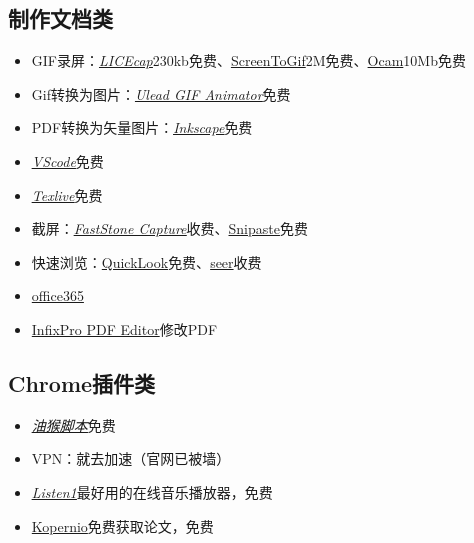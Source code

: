 \documentclass[UTF8]{ctexbook}
\begin{document}
\subsection{制作文档类}
\begin{itemize}
	\item GIF录屏：\underline{\textit{\href{https://www.cockos.com/licecap/}{LICEcap}}}\quad 230kb免费、\href{https://www.screentogif.com/?l=zh_cn}{ScreenToGif}\quad 2M免费、\href{https://ocam.en.softonic.com}{Ocam}\quad 10Mb免费
	\item Gif转换为图片：\underline{\textit{\href{https://ulead-gif-animator.jaleco.com}{Ulead GIF Animator}}}\quad 免费
	\item PDF转换为矢量图片：\underline{\textit{\href{https://inkscape.org}{Inkscape}}}\quad 免费
	\item \underline{\textit{\href{https://code.visualstudio.com}{VScode}}}\quad 免费
	\item \underline{\textit{\href{https://mirrors.tuna.tsinghua.edu.cn/CTAN/systems/texlive/Images/}{Texlive}}}\quad 免费
	\item 截屏：\underline{\textit{\href{http://www.faststone.org/FSCaptureDetail.htm}{FastStone Capture}}}\quad 收费、\href{https://www.snipaste.com}{Snipaste}\quad 免费
	\item 快速浏览：\href{https://pooi.moe/QuickLook/}{QuickLook}\quad 免费、\href{http://1218.io}{seer}\quad 收费
	\item \href{https://otp.landian.vip/zh-cn/}{office365}
	\item \href{http://www.dayanzai.me/infixpro-pdf-editor.html}{InfixPro PDF Editor}\quad 修改PDF
\end{itemize}

\subsection{Chrome插件类}
\begin{itemize}
	\item \underline{\textit{\href{https://greasyfork.org/zh-CN}{油猴脚本}}}\quad 免费
	\item VPN：就去加速（官网已被墙）
	\item \underline{\textit{\href{http://listen1.github.io/listen1/}{Listen1}}}\quad 最好用的在线音乐播放器，免费
	\item \href{https://kopernio.com}{Kopernio}\quad 免费获取论文，免费
\end{itemize}
\end{document}
